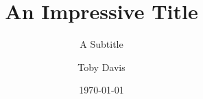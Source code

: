 \title{An Impressive Title}
\subtitle{A Subtitle}

\author{Toby Davis}
\date{\today}

\pagestyle{fancy}
\fancyhf{}


\fancyhf[ch]{\MyTitle}


\maketitle
